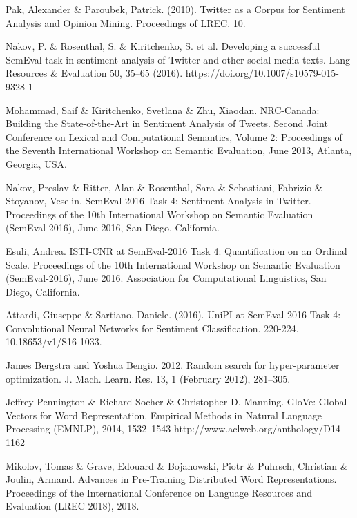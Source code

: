 \documentclass[11pt,twocolumn]{article}
\begin{document}
    \begin{thebibliography}{9}
        Pak, Alexander \& Paroubek, Patrick. (2010). Twitter as a Corpus for Sentiment Analysis and Opinion
        Mining. Proceedings of LREC. 10.

        Nakov, P. \& Rosenthal, S. \& Kiritchenko, S. et al. Developing a successful SemEval task in sentiment
        analysis of Twitter and other social media texts. Lang Resources \& Evaluation 50, 35–65 (2016).
        https://doi.org/10.1007/s10579-015-9328-1

        Mohammad, Saif \& Kiritchenko, Svetlana \& Zhu, Xiaodan. NRC-Canada: Building the State-of-the-Art in
        Sentiment Analysis of Tweets. Second Joint Conference on Lexical and Computational Semantics,
        Volume 2: Proceedings of the Seventh International Workshop on Semantic Evaluation,
        June 2013, Atlanta, Georgia, USA.

        Nakov, Preslav \& Ritter, Alan \& Rosenthal, Sara \& Sebastiani, Fabrizio \& Stoyanov, Veselin.
        SemEval-2016 Task 4: Sentiment Analysis in Twitter. Proceedings of the 10th International Workshop on
        Semantic Evaluation (SemEval-2016), June 2016, San Diego, California.

        Esuli, Andrea. ISTI-CNR at SemEval-2016 Task 4: Quantification on an Ordinal Scale. Proceedings of the
        10th International Workshop on Semantic Evaluation (SemEval-2016), June 2016. Association for
        Computational Linguistics, San Diego, California.

        Attardi, Giuseppe \& Sartiano, Daniele. (2016). UniPI at SemEval-2016 Task 4: Convolutional Neural
        Networks for Sentiment Classification. 220-224. 10.18653/v1/S16-1033.

        James Bergstra and Yoshua Bengio. 2012. Random search for hyper-parameter optimization. J. Mach. Learn.
        Res. 13, 1 (February 2012), 281–305.

        Jeffrey Pennington \& Richard Socher \& Christopher D. Manning. GloVe: Global Vectors for Word
        Representation. Empirical Methods in Natural Language Processing (EMNLP), 2014, 1532--1543
        http://www.aclweb.org/anthology/D14-1162

        Mikolov, Tomas \& Grave, Edouard \& Bojanowski, Piotr \& Puhrsch, Christian \& Joulin, Armand.
        Advances in Pre-Training Distributed Word Representations. Proceedings of the International Conference
        on Language Resources and Evaluation (LREC 2018), 2018.
    \end{thebibliography}
\end{document}
